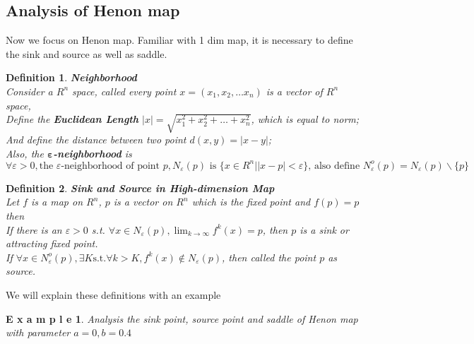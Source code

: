 \documentclass[12pt]{article}
\theoremstyle{plain}
\newtheorem{definition}{\textbf{Definition}}[section]
\newtheorem{example}{\textbf{E x a m p l e}}[section]
\begin{document}
\newpage
\subsection{Analysis of Henon map}
Now we focus on Henon map. Familiar with 1 dim map, it is necessary to define the sink and source as well as saddle.

\begin{definition}\textbf{Neighborhood}
\\\noindent Consider a $R^n$ space, called every point $x = (x_1, x_2, \ldots x_n)$ is a vector of $R^n$ space,
\\\noindent Define the \textbf{Euclidean Length} $|x| = \sqrt{x_1^2 + x_2^2 + \ldots + x_n^2}$, which is equal to norm;
\\\noindent And define the distance between two point $d(x, y) = |x - y|$;
\\\noindent Also, the \textbf{$\mathbf{\varepsilon}$-neighborhood} is 
$$
\forall \varepsilon > 0, \text{the }\varepsilon \text{-neighborhood of point }p, N_\varepsilon(p) \text{ is } \{x\in R^n | |x - p| < \varepsilon\} \text{, also define }N_\varepsilon^o(p) = N_\varepsilon(p)\backslash\{p\}
$$
\end{definition}

\begin{definition}\textbf{Sink and Source in High-dimension Map}
\\\noindent Let $f$ is a map on $R^n$, $p$ is a vector on $R^n$ which is the fixed point and $f(p) = p$ then 
\\\noindent If there is an $\varepsilon > 0$ s.t. $\forall x \in N_\varepsilon(p), \lim_{k \rightarrow \infty}f^k(x) = p$, then $p$ is a sink or attracting fixed point.
\\\noindent If $\forall x \in N_\varepsilon^o(p), \exists K \text{s.t.} \forall k > K, f^k(x) \notin N_\varepsilon(p)$, then called the point $p$ as source.
\end{definition}


We will explain these definitions with an example

\begin{example} \label{Henon-map-0-0*4}Analysis the sink point, source point and saddle of Henon map with parameter $a = 0, b = 0.4$
\end{example}
\end{document}
